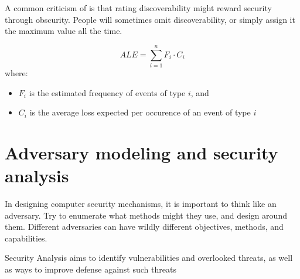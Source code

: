 \documentclass[code]{amznotes}
\begin{document}
A common criticism of  is that rating discoverability might reward security through obscurity. People will sometimes omit discoverability, or simply assign it the maximum value all the time.


\[ ALE = \sum_{i=1}^{n} F_i \cdot C_i \]
where:
\begin{itemize}
    \item $F_i$ is the estimated frequency of events of type $i$, and
    \item $C_i$ is the average loss expected per occurence of an event of type $i$
\end{itemize}

\section{Adversary modeling and security analysis}


In designing computer security mechanisms, it is important to think like an adversary. Try to enumerate what methods might they use, and design around them. Different adversaries can have wildly different objectives, methods, and capabilities.

\begin{dfnbox}{Security Analysis}{}
     aims to identify vulnerabilities and overlooked threats, as well as ways to improve defense against such threats
\end{dfnbox}
\end{document}
